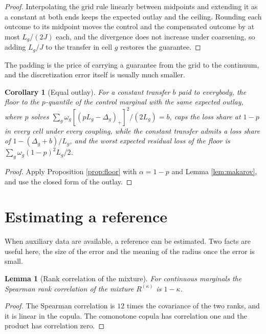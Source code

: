 \documentclass[11pt,a4paper]{article}
\theoremstyle{notesplain}
\newtheorem{lemma}[theorem]{Lemma}
\newtheorem{corollary}[theorem]{Corollary}
\theoremstyle{notesupright}
\numberwithin{equation}{section}
\begin{document}
\begin{proof}
Interpolating the grid rule linearly between midpoints and extending it as a constant at both ends keeps the expected outlay and the ceiling. Rounding each outcome to its midpoint moves the control and the compensated outcome by at most $L_g/(2J)$ each, and the divergence does not increase under coarsening, so adding $L_g/J$ to the transfer in cell $g$ restores the guarantee.
\end{proof}

The padding is the price of carrying a guarantee from the grid to the continuum, and the discretization error itself is usually much smaller.

\begin{corollary}[Equal outlay]
\label{cor:equal}
For a constant transfer $b$ paid to everybody, the floor to the $p$-quantile of the control marginal with the same expected outlay, where $p$ solves $\sum_g\omega_g[(pL_g-\Delta_g)_+]^2/(2L_g)=b$, caps the loss share at $1-p$ in every cell under every coupling, while the constant transfer admits a loss share of $1-(\Delta_g+b)/L_g$, and the worst expected residual loss of the floor is $\sum_g\omega_g(1-p)^2L_g/2$.
\end{corollary}

\begin{proof}
Apply Proposition \ref{prop:floor} with $\alpha=1-p$ and Lemma \ref{lem:makarov}, and use the closed form of the outlay.
\end{proof}

\section{Estimating a reference}
\label{sec:estimation}
When auxiliary data are available, a reference can be estimated. Two facts are useful here, the size of the error and the meaning of the radius once the error is small.

\begin{lemma}[Rank correlation of the mixture]
\label{lem:spearman}
For continuous marginals the Spearman rank correlation of the mixture $R^{(\kappa)}$ is $1-\kappa$.
\end{lemma}

\begin{proof}
The Spearman correlation is $12$ times the covariance of the two ranks, and it is linear in the copula. The comonotone copula has correlation one and the product has correlation zero.
\end{proof}
\end{document}
